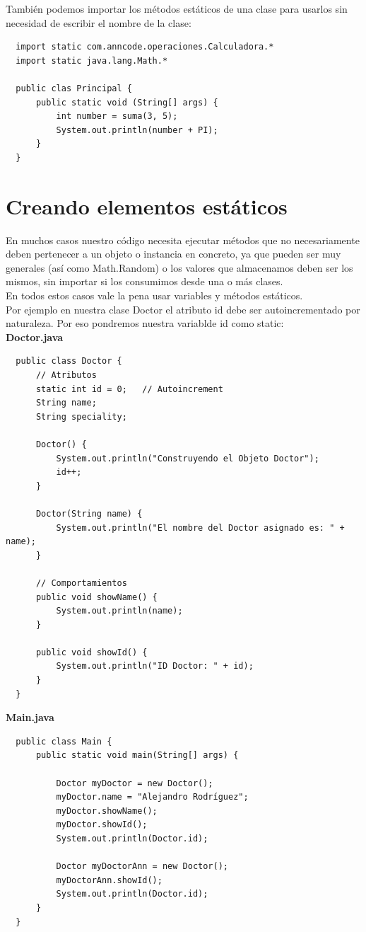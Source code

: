 \documentclass{article}
\begin{document}
También podemos importar los métodos estáticos de una clase para usarlos sin
necesidad de escribir el nombre de la clase:\\

\begin{verbatim}
  import static com.anncode.operaciones.Calculadora.*
  import static java.lang.Math.*

  public clas Principal {
      public static void (String[] args) {
          int number = suma(3, 5);
          System.out.println(number + PI);
      }
  }
\end{verbatim}


\section{Creando elementos estáticos}%
En muchos casos nuestro código necesita ejecutar métodos que no necesariamente
deben pertenecer a un objeto o instancia en concreto, ya que pueden ser muy
generales (así como Math.Random) o los valores que almacenamos deben ser los
mismos, sin importar si los consumimos desde una o más clases.\\

En todos estos casos vale la pena usar variables y métodos estáticos.\\

Por ejemplo en nuestra clase Doctor el atributo id debe ser autoincrementado
por naturaleza. Por eso pondremos nuestra variablde id como static:\\

\textbf{Doctor.java}
\begin{verbatim}
  public class Doctor {
      // Atributos
      static int id = 0;   // Autoincrement
      String name;
      String speciality;

      Doctor() {
          System.out.println("Construyendo el Objeto Doctor");
          id++;
      }

      Doctor(String name) {
          System.out.println("El nombre del Doctor asignado es: " + name);
      }

      // Comportamientos
      public void showName() {
          System.out.println(name);
      }

      public void showId() {
          System.out.println("ID Doctor: " + id);
      }
  }
\end{verbatim}


\textbf{Main.java}
\begin{verbatim}
  public class Main {
      public static void main(String[] args) {

          Doctor myDoctor = new Doctor();
          myDoctor.name = "Alejandro Rodríguez";
          myDoctor.showName();
          myDoctor.showId();
          System.out.println(Doctor.id);

          Doctor myDoctorAnn = new Doctor();
          myDoctorAnn.showId();
          System.out.println(Doctor.id);
      }
  }
\end{verbatim}
\end{document}
